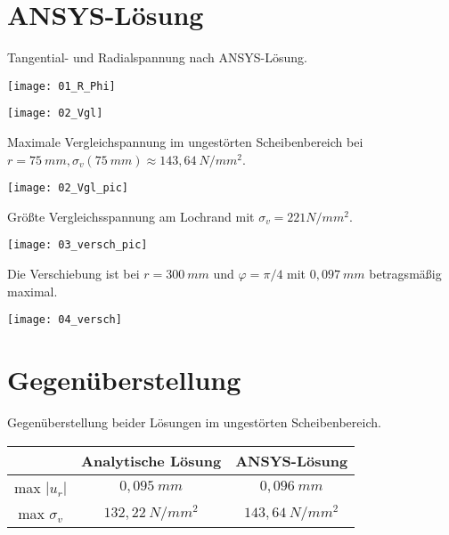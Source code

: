 \documentclass[]{article}
\begin{document}
\section{ANSYS-L\"osung}
Tangential- und Radialspannung nach ANSYS-L\"osung.\\
\begin{center}
\texttt{[image: 01\_R\_Phi]}
\end{center}
\begin{center}
\texttt{[image: 02\_Vgl]}
\end{center}
Maximale Vergleichspannung im ungest\"orten Scheibenbereich bei $r=75\ mm, \sigma_v(75\ mm)\approx 143,64\ N/mm^2$.\\
\begin{center}
\texttt{[image: 02\_Vgl\_pic]}
\end{center}
Größte Vergleichsspannung am Lochrand mit $\sigma_v=221 N/mm^2$.
\begin{center}
\texttt{[image: 03\_versch\_pic]}
\end{center}
Die Verschiebung ist bei $r=300\ mm$ und $\varphi=\pi/4$ mit $0,097\ mm$ betragsm\"aßig maximal.
\begin{center}
\texttt{[image: 04\_versch]}
\end{center}
\section{Gegen\"uberstellung}
Gegen\"uberstellung beider L\"osungen im ungest\"orten Scheibenbereich.\\
\begin{tabular}{c|cc}
& Analytische L\"osung& ANSYS-L\"osung\\ \hline
max $|u_r|$ & $0,095\ mm$& $0,096\ mm$\\
max $\sigma_v$ & $132,22\ N/mm^2$ & $143,64\ N/mm^2$
\end{tabular}
\end{document}
